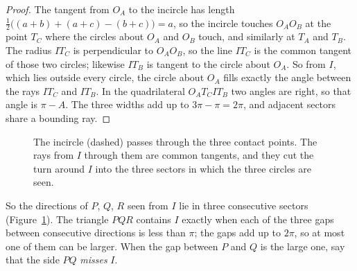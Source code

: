 \documentclass[11pt]{article}
\theoremstyle{remark}
\begin{document}
\begin{proof}
The tangent from $O_A$ to the incircle has length
$\frac12\bigl((a+b)+(a+c)-(b+c)\bigr)=a$, so the incircle touches $O_AO_B$ at the point $T_C$
where the circles about $O_A$ and $O_B$ touch, and similarly at $T_A$ and $T_B$. The radius
$IT_C$ is perpendicular to $O_AO_B$, so the line $IT_C$ is the common tangent of those two
circles; likewise $IT_B$ is tangent to the circle about $O_A$. So from $I$, which lies outside
every circle, the circle about $O_A$ fills exactly the angle between the rays $IT_C$ and $IT_B$.
In the quadrilateral $O_AT_CIT_B$ two angles are right, so that angle is $\pi-A$. The three
widths add up to $3\pi-\pi=2\pi$, and adjacent sectors share a bounding ray.
\end{proof}

\begin{figure}[ht]
\centering
{}
\caption{The incircle (dashed) passes through the three contact points. The rays from $I$ through
them are common tangents, and they cut the turn around $I$ into the three sectors in which the
three circles are seen.}
\label{fig:sectors}
\end{figure}

So the directions of $P$, $Q$, $R$ seen from $I$ lie in three consecutive sectors
(Figure~\ref{fig:sectors}). The triangle $PQR$ contains $I$ exactly when each of the three gaps
between consecutive directions is less than $\pi$; the gaps add up to $2\pi$, so at most one of
them can be larger. When the gap between $P$ and $Q$ is the large one, say that the side $PQ$
\emph{misses} $I$.
\end{document}
